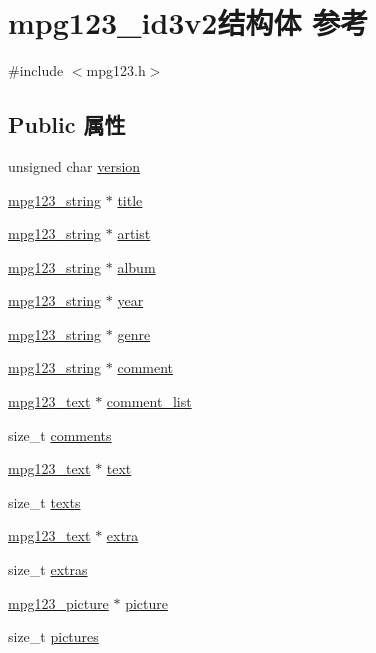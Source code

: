 \hypertarget{structmpg123__id3v2}{}\section{mpg123\+\_\+id3v2结构体 参考}
\label{structmpg123__id3v2}


{\ttfamily \#include $<$mpg123.\+h$>$}

\subsection*{Public 属性}
\begin{DoxyCompactItemize}
\item 
unsigned char \hyperlink{structmpg123__id3v2_ab64e67e2d2bc5cc0b45e9598a8d386d6}{version}
\item 
\hyperlink{structmpg123__string}{mpg123\+\_\+string} $\ast$ \hyperlink{structmpg123__id3v2_a287e2a93e889c4a9b60b634a4dee4f13}{title}
\item 
\hyperlink{structmpg123__string}{mpg123\+\_\+string} $\ast$ \hyperlink{structmpg123__id3v2_a5d269222d5c917356f337e999a38c1f3}{artist}
\item 
\hyperlink{structmpg123__string}{mpg123\+\_\+string} $\ast$ \hyperlink{structmpg123__id3v2_adb45f4408f3e650dc70282060d631336}{album}
\item 
\hyperlink{structmpg123__string}{mpg123\+\_\+string} $\ast$ \hyperlink{structmpg123__id3v2_a6b2125b4b38019370646be4dc4a9ad23}{year}
\item 
\hyperlink{structmpg123__string}{mpg123\+\_\+string} $\ast$ \hyperlink{structmpg123__id3v2_a1655bf8bfc836ab94660bf981373f3cb}{genre}
\item 
\hyperlink{structmpg123__string}{mpg123\+\_\+string} $\ast$ \hyperlink{structmpg123__id3v2_a33f276ee0202d9bb8609b90a2dc84e41}{comment}
\item 
\hyperlink{structmpg123__text}{mpg123\+\_\+text} $\ast$ \hyperlink{structmpg123__id3v2_ab848dd213b0c7c352ccf4db299eb47fb}{comment\+\_\+list}
\item 
size\+\_\+t \hyperlink{structmpg123__id3v2_aa6b0ae610df4b4f5ed7f848ed88c86c9}{comments}
\item 
\hyperlink{structmpg123__text}{mpg123\+\_\+text} $\ast$ \hyperlink{structmpg123__id3v2_a2974751dc4b5bc34819d0acb1b90e944}{text}
\item 
size\+\_\+t \hyperlink{structmpg123__id3v2_a1ea43150e210d554f297bc317d5fb8ea}{texts}
\item 
\hyperlink{structmpg123__text}{mpg123\+\_\+text} $\ast$ \hyperlink{structmpg123__id3v2_af11a6a5218b0616811349ee2efa8ece5}{extra}
\item 
size\+\_\+t \hyperlink{structmpg123__id3v2_afefe85eb6aea14e5463b83d4e8b9ef96}{extras}
\item 
\hyperlink{structmpg123__picture}{mpg123\+\_\+picture} $\ast$ \hyperlink{structmpg123__id3v2_ad2539ee2a294163a20ef2f67bc241d76}{picture}
\item 
size\+\_\+t \hyperlink{structmpg123__id3v2_ac13f50ac1a8d70b8be6580a71efc89b5}{pictures}
\end{DoxyCompactItemize}


